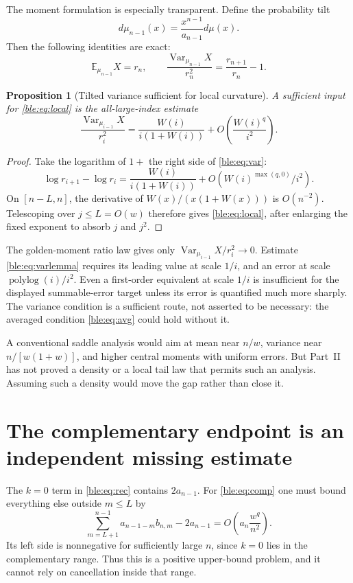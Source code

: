 \documentclass[11pt]{article}
\numberwithin{equation}{section}
\newtheorem{proposition}[theorem]{Proposition}
\theoremstyle{definition}
\theoremstyle{remark}
\newcommand{\E}{\mathbb E}
\newcommand{\Var}{\operatorname{Var}}
\begin{document}
The moment formulation is especially transparent. Define the probability
tilt
\[
 d\mu_{n-1}(x)=\frac{x^{n-1}}{a_{n-1}}d\mu(x).
\]
Then the following identities are exact:
\begin{equation}\label{ble:eq:var}
 \E_{\mu_{n-1}}X=r_n,\qquad
 \frac{\Var_{\mu_{n-1}}X}{r_n^2}
 =\frac{r_{n+1}}{r_n}-1.
\end{equation}
\begin{proposition}[Tilted variance sufficient for local curvature]\label{ble:prop:variance}
A sufficient input for \eqref{ble:eq:local} is the all-large-index
estimate
\begin{equation}\label{ble:eq:varlemma}
 \frac{\Var_{\mu_{i-1}}X}{r_i^2}
 =\frac{W(i)}{i(1+W(i))}+O\!\left(\frac{W(i)^q}{i^2}\right).
\end{equation}
\end{proposition}
\begin{proof}
Take the logarithm of $1+$ the right side of \eqref{ble:eq:var}:
\[
 \log r_{i+1}-\log r_i
 =\frac{W(i)}{i(1+W(i))}+O(W(i)^{\max(q,0)}/i^2).
\]
On $[n-L,n]$, the derivative of $W(x)/(x(1+W(x)))$ is $O(n^{-2})$.
Telescoping over $j\le L=O(w)$ therefore gives \eqref{ble:eq:local}, after
enlarging the fixed exponent to absorb $j$ and $j^2$.
\end{proof}

The golden-moment ratio law gives only $\Var_{\mu_{i-1}}X/r_i^2\to0$.
Estimate \eqref{ble:eq:varlemma} requires its leading value at scale
$1/i$, and an error at scale $\operatorname{polylog}(i)/i^2$. Even a
first-order equivalent at scale $1/i$ is insufficient for the displayed
summable-error target unless its error is quantified much more sharply.
The variance condition is a sufficient route, not asserted to be
necessary: the averaged condition \eqref{ble:eq:avg} could hold without
it.

A conventional saddle analysis would aim at mean near $n/w$, variance near
$n/[w(1+w)]$, and higher central moments with uniform errors. But Part~II
has not proved a density or a local tail law that permits such an
analysis. Assuming such a density would move the gap rather than close
it.

\section{The complementary endpoint is an independent missing estimate}\label{ble:sec:complement}
The $k=0$ term in \eqref{ble:eq:rec} contains $2a_{n-1}$. For
\eqref{ble:eq:comp} one must bound everything else outside $m\le L$ by
\begin{equation}\label{ble:eq:remainderlemma}
 \sum_{m=L+1}^{n-1}a_{n-1-m}b_{n,m}-2a_{n-1}
       =O\!\left(a_n\frac{w^q}{n^2}\right).
\end{equation}
Its left side is nonnegative for sufficiently large $n$, since $k=0$ lies
in the complementary range. Thus this is a positive upper-bound problem,
and it cannot rely on cancellation inside that range.
\end{document}
